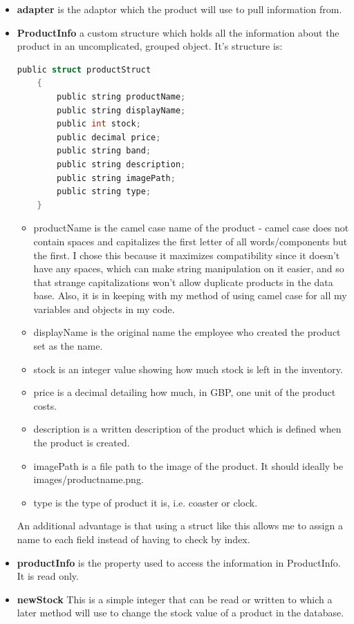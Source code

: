 ﻿\documentclass{article}
\begin{document}
    \begin{itemize}
        \item \textbf{adapter} is the adaptor which the product will use to pull information from.
        \item \textbf{ProductInfo} a custom structure which holds all the information about the product in an uncomplicated, grouped object.
        It's structure is:
        \begin{lstlisting}[language=C]
    public struct productStruct
    {
        public string productName;
        public string displayName;
        public int stock;
        public decimal price;
        public string band;
        public string description;
        public string imagePath;
        public string type;
    }
        \end{lstlisting}
        \begin{itemize}
            \item productName is the camel case name of the product - camel case does not contain spaces and capitalizes the first letter of all words/components but the first.
            I chose this because it maximizes compatibility since it doesn't have any spaces, which can make string manipulation on it easier, and so that strange capitalizations won't allow duplicate products in the data base.
            Also, it is in keeping with my method of using camel case for all my variables and objects in my code.
            \item displayName is the original name the employee who created the product set as the name.
            \item stock is an integer value showing how much stock is left in the inventory.
            \item price is a decimal detailing how much, in GBP, one unit of the product costs.
            \item description is a written description of the product which is defined when the product is created.
            \item imagePath is a file path to the image of the product.
            It should ideally be images/productname.png.
            \item type is the type of product it is, i.e. coaster or clock.
        \end{itemize}
        An additional advantage is that using a struct like this allows me to assign a name to each field instead of having to check by index.
        \\
        \item \textbf{productInfo} is the property used to access the information in ProductInfo.
        It is read only.
        \item \textbf{newStock} This is a simple integer that can be read or written to which a later method will use to change the stock value of a product in the database.
    \end{itemize}
\end{document}
